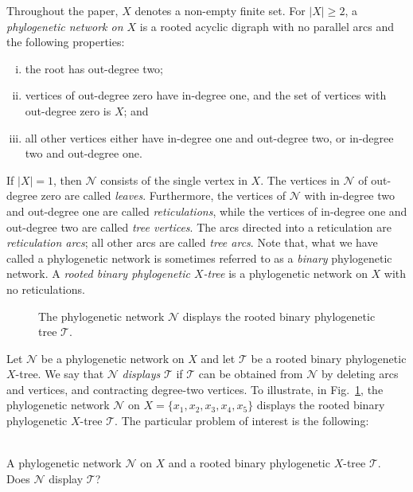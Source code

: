\documentclass[11pt]{amsart}
\begin{document}
Throughout the paper, $X$ denotes a non-empty finite set. For $|X|\ge 2$, a {\em phylogenetic network on $X$} is a rooted acyclic digraph with no parallel arcs and the following properties:
\begin{enumerate}[(i)]
\item the root has out-degree two;

\item vertices of out-degree zero have in-degree one, and the set of vertices with out-degree zero is $X$; and

\item all other vertices either have in-degree one and out-degree two, or in-degree two and out-degree one.
\end{enumerate}
If $|X|=1$, then ${{\mathcal N}}$ consists of the single vertex in $X$. The vertices in ${{\mathcal N}}$ of out-degree zero are called {\em leaves}. Furthermore, the vertices of ${{\mathcal N}}$ with in-degree two and out-degree one are called {\em reticulations}, while the vertices of in-degree one and out-degree two are called {\em tree vertices}. The arcs directed into a reticulation are {\em reticulation arcs}; all other arcs are called {\em tree arcs}. Note that, what we have called a phylogenetic network is sometimes referred to as a {\em binary} phylogenetic network. A {\em rooted binary phylogenetic $X$-tree} is a phylogenetic network on $X$ with no reticulations.

\begin{figure}
\center

\caption{The phylogenetic network ${{\mathcal N}}$ displays the rooted binary phylogenetic tree ${{\mathcal T}}$.}
\label{display}
\end{figure}

Let ${{\mathcal N}}$ be a phylogenetic network on $X$ and let ${{\mathcal T}}$ be a rooted binary phylogenetic $X$-tree. We say that ${{\mathcal N}}$ {\em displays} ${{\mathcal T}}$ if ${{\mathcal T}}$ can be obtained from ${{\mathcal N}}$ by deleting arcs and vertices, and contracting degree-two vertices. To illustrate, in Fig.~\ref{display}, the phylogenetic network ${{\mathcal N}}$ on $X=\{x_1, x_2, x_3, x_4, x_5\}$ displays the rooted binary phylogenetic $X$-tree ${{\mathcal T}}$. The particular problem of interest is the following:

 \\
 A phylogenetic network ${{\mathcal N}}$ on $X$ and a rooted binary phylogenetic $X$-tree ${{\mathcal T}}$. \\
 Does ${{\mathcal N}}$ display ${{\mathcal T}}$?
\end{document}
